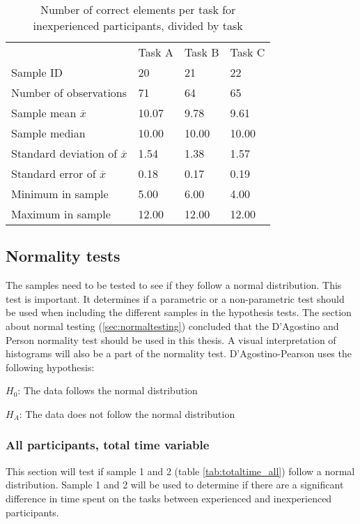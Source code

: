 \begin{table}[H]
	\centering
	\begin{tabular}{l|l|l|l}
		 & Task A & Task B & Task C \\ 
		Sample ID & 20 & 21 & 22 \\ \hline
		Number of observations & 71 & 64  & 65 \\
		Sample mean $\overline{x}$  & 10.07  &  9.78 &  9.61  \\
		Sample median  & 10.00  & 10.00  &  10.00  \\
		Standard deviation of $\overline{x}$  & 1.54  & 1.38  & 1.57   \\
		Standard error of $\overline{x}$  & 0.18 & 0.17 & 0.19  \\
		Minimum in sample  & 5.00 & 6.00 &  4.00  \\
		Maximum in sample  & 12.00 & 12.00  & 12.00 \\ \hline
	\end{tabular}
	\caption[Correct elements, inexperienced per task]{Number of correct elements per task for inexperienced participants, divided by task}
	\label{tab:totalcorrect_tasks_inexperienced}
\end{table}
\vspace{0.5cm}

\subsection{Normality tests}\label{sec:normality_results}
The samples need to be tested to see if they follow a normal distribution. This test is important. It determines if a parametric or a non-parametric test should be used when including the different samples in the hypothesis tests. The section about normal testing (\ref{sec:normaltesting}) concluded that the D'Agostino and Person normality test should be used in this thesis. A visual interpretation of histograms will also be a part of the normality test. D'Agostino-Pearson uses the following hypothesis:\newline

\centerline{$H_{0}$: The data follows the normal distribution} 
\centerline{$H_{A}$: The data does not follow the normal distribution}


\subsubsection[Sample 1 and 2]{All participants, total time variable}\label{sec:sample1,2_normresult}
This section will test if sample 1 and 2 (table \ref{tab:totaltime_all}) follow a normal distribution. Sample 1 and 2 will be used to determine if there are a significant difference in time spent on the tasks between experienced and inexperienced participants. 

